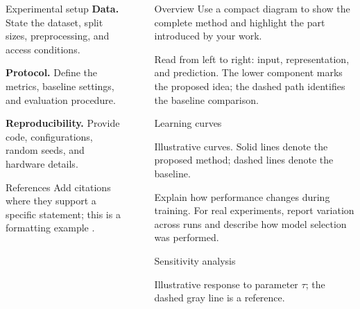 \documentclass[final]{beamer}
\newlength{\sepwidth}
\newlength{\colwidth}
\newcommand{\separatorcolumn}{\begin{column}{\sepwidth}\end{column}}
\begin{document}
\begin{frame}[t]
\begin{columns}[t]
\begin{column}{\colwidth}
  \begin{exampleblock}{Experimental setup}
    \textbf{Data.} State the dataset, split sizes, preprocessing, and access conditions.

    \textbf{Protocol.} Define the metrics, baseline settings, and evaluation procedure.

    \textbf{Reproducibility.} Provide code, configurations, random seeds, and hardware details.
  \end{exampleblock}

  \begin{block}{References}
    {\small Add citations where they support a specific statement; this is a
    formatting example \cite{shannon1948communication}.
    }
  \end{block}
\end{column}

\separatorcolumn
\begin{column}{\colwidth}
  \begin{block}{Overview}
    Use a compact diagram to show the complete method and highlight the part
    introduced by your work.
    \begin{center}\methoddiagram\end{center}
    Read from left to right: input, representation, and prediction. The lower
    component marks the proposed idea; the dashed path identifies the baseline comparison.
  \end{block}

  \begin{block}{Learning curves}
    \begin{center}
      \begin{minipage}{0.48\linewidth}\end{minipage}\hfill
      \begin{minipage}{0.48\linewidth}\end{minipage}
    \end{center}
    {\small Illustrative curves. Solid lines denote the proposed method; dashed lines denote the baseline.}

    Explain how performance changes during training. For real experiments,
    report variation across runs and describe how model selection was performed.
  \end{block}

  \begin{block}{Sensitivity analysis}
    \begin{center}\sensitivityplot\end{center}
    {\small Illustrative response to parameter $\tau$; the dashed gray line is a reference.}


\end{block}
\end{column}
\end{columns}
\end{frame}
\end{document}
